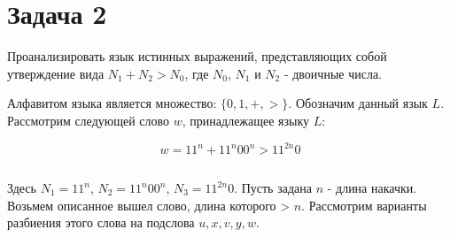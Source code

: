 \documentclass[a4paper, 14pt]{article}
\begin{document}
\section{Задача 2}
Проанализировать язык истинных выражений, представляющих собой утверждение вида $N_1 + N_2 > N_0$, где $N_0$, $N_1$ и $N_2$ - двоичные числа.

Алфавитом языка является множество: $\{0, 1, +, > \}$. Обозначим данный язык $L$.
Рассмотрим следующей слово $w$, принадлежащее языку $L$:

$$
w =  11^n + 11^n00^n > 11^{2n}0
$$

$$
$$


Здесь $N_1 = 11^n$, $N_2 = 11^n00^n$, $N_3 = 11^{2n}0$.
Пусть задана $n$ - длина накачки. Возьмем описанное вышел слово, длина которого > $n$.
Рассмотрим варианты разбиения этого слова на подслова $u, x, v ,y, w$.
\end{document}
